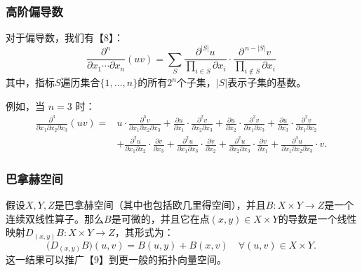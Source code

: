 \subsubsection{高阶偏导数}
对于偏导数，我们有【8】：
$$
\frac{\partial^{n}}{\partial x_{1}\cdots \partial x_{n}}(uv) 
= \sum_{S} 
\frac{\partial^{|S|}u}{\prod_{i\in S}\partial x_{i}}
\cdot
\frac{\partial^{\,n-|S|}v}{\prod_{i\notin S}\partial x_{i}}~
$$
其中，指标$S$遍历集合$\{1,\ldots,n\}$的所有$2^n$个子集，$|S|$表示子集的基数。

例如，当 $n=3$ 时：
$$
\begin{aligned}
\frac{\partial^{3}}{\partial x_{1}\partial x_{2}\partial x_{3}}(uv) 
={}& u \cdot \frac{\partial^{3}v}{\partial x_{1}\partial x_{2}\partial x_{3}}
+ \frac{\partial u}{\partial x_{1}} \cdot \frac{\partial^{2}v}{\partial x_{2}\partial x_{3}}
+ \frac{\partial u}{\partial x_{2}} \cdot \frac{\partial^{2}v}{\partial x_{1}\partial x_{3}}
+ \frac{\partial u}{\partial x_{3}} \cdot \frac{\partial^{2}v}{\partial x_{1}\partial x_{2}} \\
&+ \frac{\partial^{2}u}{\partial x_{1}\partial x_{2}} \cdot \frac{\partial v}{\partial x_{3}}
+ \frac{\partial^{2}u}{\partial x_{1}\partial x_{3}} \cdot \frac{\partial v}{\partial x_{2}}
+ \frac{\partial^{2}u}{\partial x_{2}\partial x_{3}} \cdot \frac{\partial v}{\partial x_{1}}
+ \frac{\partial^{3}u}{\partial x_{1}\partial x_{2}\partial x_{3}} \cdot v.
\end{aligned}~
$$
\subsubsection{巴拿赫空间}
假设$X, Y, Z$是巴拿赫空间（其中也包括欧几里得空间），并且$B : X \times Y \to Z$是一个连续双线性算子。那么$B$是可微的，并且它在点$(x, y)\in X \times Y$的导数是一个线性映射$D_{(x,y)}B : X \times Y \to Z$，其形式为：
$$
\bigl(D_{(x,y)}B\bigr)(u,v) = B(u,y) + B(x,v) \quad \forall (u,v)\in X\times Y.~
$$
这一结果可以推广【9】到更一般的拓扑向量空间。
